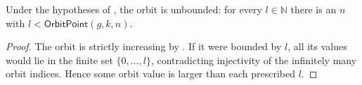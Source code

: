 \begin{lemma}
Under the hypotheses of , the orbit is unbounded:
for every $l\in\mathbb N$ there is an $n$ with
$l<\mathsf{OrbitPoint}(g,k,n)$.
\end{lemma}
\begin{proof}
The orbit is strictly increasing by .  If it were
bounded by $l$, all its values would lie in the finite set
$\{0,\ldots,l\}$, contradicting injectivity of the infinitely many orbit
indices.  Hence some orbit value is larger than each prescribed $l$.
\end{proof}

